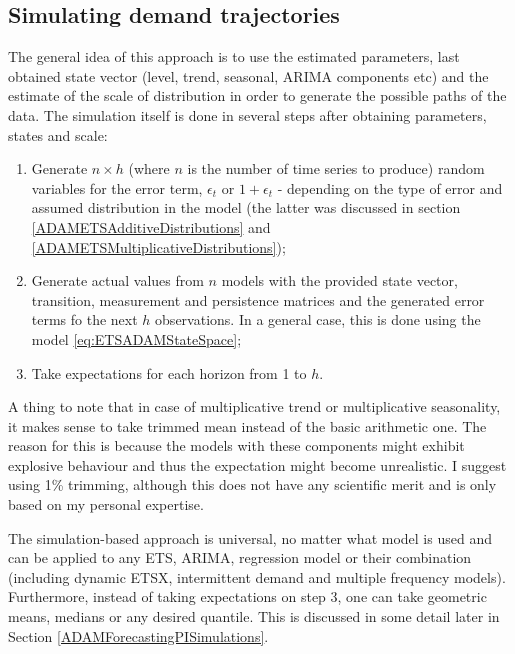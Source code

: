 \documentclass[
]{book}
\providecommand{\tightlist}{%
  \setlength{\itemsep}{0pt}\setlength{\parskip}{0pt}}
\theoremstyle{definition}
\theoremstyle{definition}
\theoremstyle{definition}
\theoremstyle{definition}
\theoremstyle{remark}
\begin{document}
\hypertarget{ADAMForecastingExpectationSimulations}{%
\subsection{Simulating demand trajectories}\label{ADAMForecastingExpectationSimulations}}

The general idea of this approach is to use the estimated parameters, last obtained state vector (level, trend, seasonal, ARIMA components etc) and the estimate of the scale of distribution in order to generate the possible paths of the data. The simulation itself is done in several steps after obtaining parameters, states and scale:

\begin{enumerate}
\def\labelenumi{\arabic{enumi}.}
\tightlist
\item
  Generate \(n \times h\) (where \(n\) is the number of time series to produce) random variables for the error term, \(\epsilon_t\) or \(1+\epsilon_t\) - depending on the type of error and assumed distribution in the model (the latter was discussed in section \ref{ADAMETSAdditiveDistributions} and \ref{ADAMETSMultiplicativeDistributions});
\item
  Generate actual values from \(n\) models with the provided state vector, transition, measurement and persistence matrices and the generated error terms fo the next \(h\) observations. In a general case, this is done using the model \eqref{eq:ETSADAMStateSpace};
\item
  Take expectations for each horizon from 1 to \(h\).
\end{enumerate}

A thing to note that in case of multiplicative trend or multiplicative seasonality, it makes sense to take trimmed mean instead of the basic arithmetic one. The reason for this is because the models with these components might exhibit explosive behaviour and thus the expectation might become unrealistic. I suggest using 1\% trimming, although this does not have any scientific merit and is only based on my personal expertise.

The simulation-based approach is universal, no matter what model is used and can be applied to any ETS, ARIMA, regression model or their combination (including dynamic ETSX, intermittent demand and multiple frequency models). Furthermore, instead of taking expectations on step 3, one can take geometric means, medians or any desired quantile. This is discussed in some detail later in Section \ref{ADAMForecastingPISimulations}.
\end{document}
